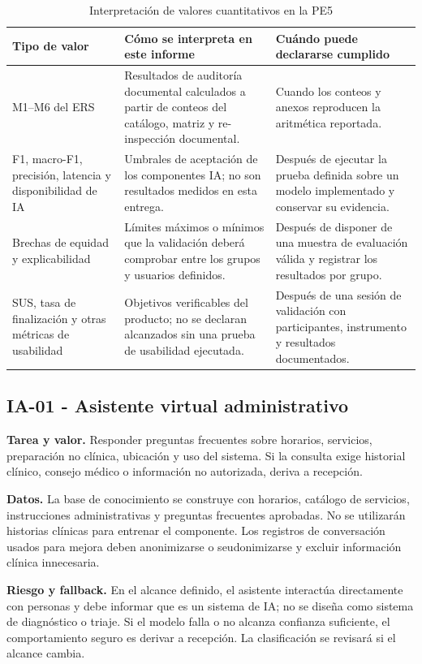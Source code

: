 \documentclass[11pt,a4paper]{article}
\begin{document}
	\begin{table}[H]\centering
		\caption{Interpretación de valores cuantitativos en la PE5}\label{tab:interpretacion-ia}
		\begin{tabularx}{\textwidth}{p{4.1cm}Y Y}\toprule
			\textbf{Tipo de valor}&\textbf{Cómo se interpreta en este informe}&\textbf{Cuándo puede declararse cumplido}\\\midrule
			M1--M6 del ERS&Resultados de auditoría documental calculados a partir de conteos del catálogo, matriz y re-inspección documental.&Cuando los conteos y anexos reproducen la aritmética reportada.\\
			F1, macro-F1, precisión, latencia y disponibilidad de IA&Umbrales de aceptación de los componentes IA; no son resultados medidos en esta entrega.&Después de ejecutar la prueba definida sobre un modelo implementado y conservar su evidencia.\\
			Brechas de equidad y explicabilidad&Límites máximos o mínimos que la validación deberá comprobar entre los grupos y usuarios definidos.&Después de disponer de una muestra de evaluación válida y registrar los resultados por grupo.\\
			SUS, tasa de finalización y otras métricas de usabilidad&Objetivos verificables del producto; no se declaran alcanzados sin una prueba de usabilidad ejecutada.&Después de una sesión de validación con participantes, instrumento y resultados documentados.\\\bottomrule
		\end{tabularx}
	\end{table}
\subsection{IA-01 - Asistente virtual administrativo}
	\textbf{Tarea y valor.} Responder preguntas frecuentes sobre horarios, servicios, preparación no clínica, ubicación y uso del sistema. Si la consulta exige historial clínico, consejo médico o información no autorizada, deriva a recepción.
	
	\textbf{Datos.} La base de conocimiento se construye con horarios, catálogo de servicios, instrucciones administrativas y preguntas frecuentes aprobadas. No se utilizarán historias clínicas para entrenar el componente. Los registros de conversación usados para mejora deben anonimizarse o seudonimizarse y excluir información clínica innecesaria.
	
	\textbf{Riesgo y fallback.} En el alcance definido, el asistente interactúa directamente con personas y debe informar que es un sistema de IA; no se diseña como sistema de diagnóstico o triaje. Si el modelo falla o no alcanza confianza suficiente, el comportamiento seguro es derivar a recepción. La clasificación se revisará si el alcance cambia.
	
\end{document}
